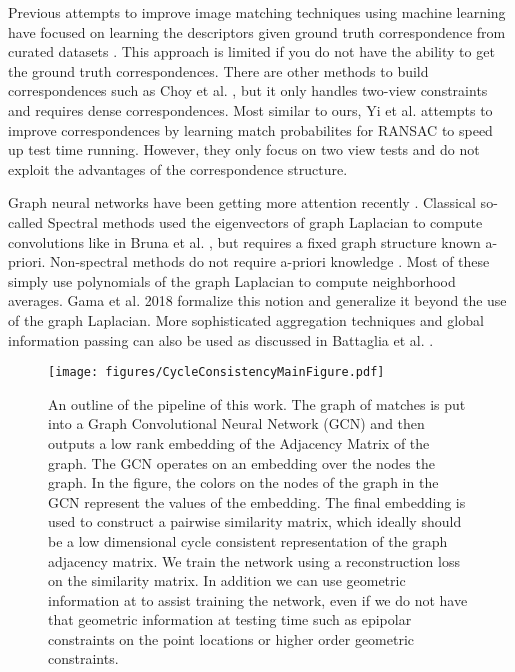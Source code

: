 \documentclass[10pt,twocolumn,letterpaper]{article}
\begin{document}
Previous attempts to improve image matching techniques using machine learning have focused on learning the descriptors given ground truth correspondence from curated datasets \cite{zagoruyko2015learning, yi2016lift, brachmann2017dsac}.
This approach is limited if you do not have the ability to get the ground truth correspondences.
There are other methods to build correspondences such as Choy et al. \cite{choy2016universal}, but it only handles two-view constraints and requires dense correspondences.
Most similar to ours, Yi et al. \cite{yi2018learning} attempts to improve correspondences by learning match probabilites for RANSAC to speed up test time running.
However, they only focus on two view tests and do not exploit the advantages of the correspondence structure.

Graph neural networks have been getting more attention recently \cite{bronstein2017geometric, bruna2013spectral, defferrard2016convolutional, kipf2016semi, scarselli2009graph, gama2018mimo, gama2018convolutional, battaglia2018relational}.
Classical so-called Spectral methods used the eigenvectors of graph Laplacian to compute convolutions like in Bruna et al. \cite{bruna2013spectral}, but requires a fixed graph structure known a-priori. 
Non-spectral methods do not require a-priori knowledge \cite{bronstein2017geometric, kipf2016semi, scarselli2009graph, gama2018convolutional}.
Most of these simply use polynomials of the graph Laplacian to compute neighborhood averages. Gama et al. 2018 \cite{gama2018mimo, gama2018convolutional} formalize this notion and generalize it beyond the use of the graph Laplacian.
More sophisticated aggregation techniques and global information passing can also be used as discussed in Battaglia et al. \cite{battaglia2018relational}.

\begin{figure*}[t]
\begin{center}
  \texttt{[image: figures/CycleConsistencyMainFigure.pdf]}
\end{center}
  \caption{
    An outline of the pipeline of this work.
    The graph of matches is put into a Graph Convolutional Neural Network (GCN) \cite{kipf2016semi} and then outputs a low rank embedding of the Adjacency Matrix of the graph.
    The GCN operates on an embedding over the nodes the graph.
    In the figure, the colors on the nodes of the graph in the GCN represent the values of the embedding.
    The final embedding is used to construct a pairwise similarity matrix, which ideally should be a low dimensional cycle consistent representation of the graph adjacency matrix.
    We train the network using a reconstruction loss on the similarity matrix.
    In addition we can use geometric information at to assist training the network, even if we do not have that geometric information at testing time such as epipolar constraints on the point locations or higher order geometric constraints.
  }
\label{fig:pipeline}
\label{fig:onecol}
\end{figure*}
\end{document}
